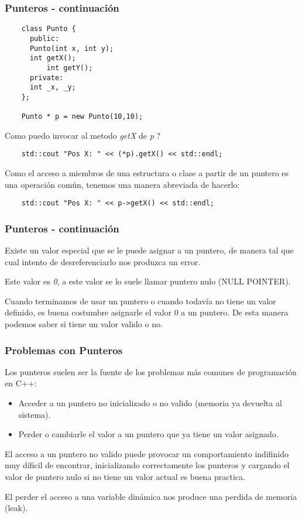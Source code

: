 \documentclass{beamer}
\begin{document}
\begin{frame}[fragile]
\frametitle{Punteros - continuación}

\begin{verbatim}
    class Punto {
      public:
	  Punto(int x, int y);
	  int getX();
          int getY();
      private:
	  int _x, _y;
    };

    Punto * p = new Punto(10,10);
\end{verbatim}

Como puedo invocar al metodo \emph{getX} de \emph{p} ?

\begin{verbatim}
    std::cout "Pos X: " << (*p).getX() << std::endl;
\end{verbatim}

Como el acceso a miembros de una estructura o clase a partir de un puntero es una operación común, tenemos una manera abreviada de hacerlo:

\begin{verbatim}
    std::cout "Pos X: " << p->getX() << std::endl;
\end{verbatim}

\end{frame}


\begin{frame}[fragile]
\frametitle{Punteros - continuación}

Existe un valor especial que se le puede asignar a un puntero, de manera tal que cual intento de desreferenciarlo nos produzca un error.

Este valor es \emph{0}, a este valor se lo suele llamar puntero nulo (NULL POINTER).


\begin{block}
Cuando terminamos de usar un puntero o cuando todavía no tiene un valor definido, es buena costumbre asignarle el valor 0 a un puntero.
De esta manera podemos saber si tiene un valor valido o no.
\end{block}

\end{frame}



\begin{frame}[fragile]
\frametitle{Problemas con Punteros}
Los punteros suelen ser la fuente de los problemas más comunes de programación en C++:

\begin{itemize}
 \item Acceder a un puntero no inicializado o no valido (memoria ya devuelta al sistema).
 \item Perder o cambiarle el valor a un puntero que ya tiene un valor asignado.
\end{itemize}

El acceso a un puntero no valido puede provocar un comportamiento indifinido muy díficil de encontrar, inicializando correctamente los punteros y cargando el valor de puntero nulo si no tiene un valor actual es buena practica.

El perder el acceso a una variable dinámica nos produce una perdida de memoria (leak).

\end{frame}
\end{document}
